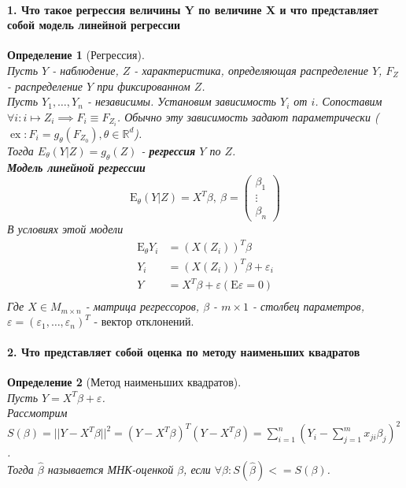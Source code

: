 \documentclass[titlepage]{article}
\newcommand{\sE}{\mathrm{E}}
\newcommand{\R}{\mathbb{R}} %
\DeclareMathOperator{\ex}{ex} %
\newtheorem{definition}{Определение}
\begin{document}
\paragraph{1. Что такое регрессия величины Y по величине X и что представляет собой модель линейной регрессии} %
\begin{definition}[Регрессия] ~\\
	Пусть $Y$ - наблюдение,  $Z$ - характеристика, определяющая распределение $Y$, $F_Z$ - распределение $Y$ при фиксированном $Z$.\\
	Пусть $Y_1,\dots,Y_n$ - независимы.
	Установим зависимость $Y_i$ от $i$.
	Сопоставим $\forall i: i \mapsto Z_i \implies F_i \equiv F_{Z_i}$.
	Обычно эту зависимость задают параметрически ($\ex: F_i = g_\theta(F_{Z_0}), \theta \in \R^d$).\\
	Тогда $E_\theta(Y|Z) = g_\theta(Z)$ - \textbf{регрессия} $Y$ по $Z$.\\
	\textbf{Модель линейной регрессии}
	\[\sE_\theta(Y|Z) = X^T\beta,\ \beta =
		\begin{pmatrix}
			\beta_1\\
			\vdots\\
			\beta_n
		\end{pmatrix}
	\]
	В условиях этой модели
	\begin{align*}
		\sE_\theta Y_i &= (X(Z_i))^T\beta\\
		Y_i &= (X(Z_i))^T\beta + \varepsilon_i\\
		Y &= X^T\beta + \varepsilon (\sE\varepsilon = 0)\\
	\end{align*}
	Где $X \in M_{m\times n}$ - матрица регрессоров, $\beta$ - $m \times 1$ - столбец параметров, $\varepsilon = (\varepsilon_1,\dots,\varepsilon_n)^T\text{ - вектор отклонений.}$
\end{definition}

\paragraph{2. Что представляет собой оценка по методу наименьших квадратов}
\begin{definition}[Метод наименьших квадратов]~\\
	Пусть $Y = X^T\beta + \varepsilon$.\\
	Рассмотрим $S(\beta) = ||Y-X^T\beta||^2=(Y-X^T\beta)^T(Y-X^T\beta) = \sum_{i=1}^n(Y_i-\sum_{j=1}^mx_{ji}\beta_j)^2$.\\
	Тогда $\hat \beta$ называется МНК-оценкой $\beta$, если $\forall \beta: S(\hat \beta)<=S(\beta)$.\\
\end{definition}
\end{document}

